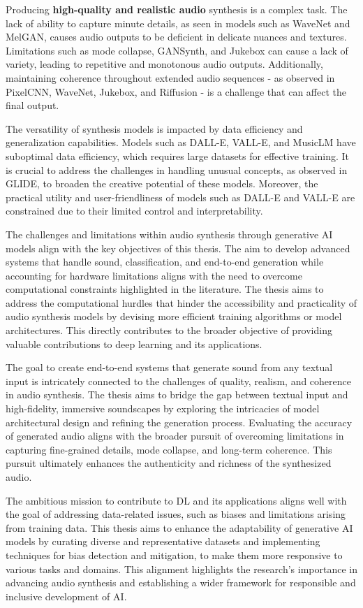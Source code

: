 Producing \textbf{high-quality and realistic audio} synthesis is a complex task. The lack of ability to capture minute details, as seen in models such as WaveNet and MelGAN, causes audio outputs to be deficient in delicate nuances and textures. Limitations such as mode collapse, GANSynth, and Jukebox can cause a lack of variety, leading to repetitive and monotonous audio outputs. Additionally, maintaining coherence throughout extended audio sequences - as observed in PixelCNN, WaveNet, Jukebox, and Riffusion - is a challenge that can affect the final output.

The versatility of synthesis models is impacted by data efficiency and generalization capabilities. Models such as DALL-E, VALL-E, and MusicLM have suboptimal data efficiency, which requires large datasets for effective training. It is crucial to address the challenges in handling unusual concepts, as observed in \ac{GLIDE}, to broaden the creative potential of these models. Moreover, the practical utility and user-friendliness of models such as DALL-E and VALL-E are constrained due to their limited control and interpretability.

The challenges and limitations within audio synthesis through generative AI models align with the key objectives of this thesis. The aim to develop advanced systems that handle sound, classification, and end-to-end generation while accounting for hardware limitations aligns with the need to overcome computational constraints highlighted in the literature. The thesis aims to address the computational hurdles that hinder the accessibility and practicality of audio synthesis models by devising more efficient training algorithms or model architectures. This directly contributes to the broader objective of providing valuable contributions to deep learning and its applications.

The goal to create end-to-end systems that generate sound from any textual input is intricately connected to the challenges of quality, realism, and coherence in audio synthesis. The thesis aims to bridge the gap between textual input and high-fidelity, immersive soundscapes by exploring the intricacies of model architectural design and refining the generation process. Evaluating the accuracy of generated audio aligns with the broader pursuit of overcoming limitations in capturing fine-grained details, mode collapse, and long-term coherence. This pursuit ultimately enhances the authenticity and richness of the synthesized audio.

The ambitious mission to contribute to \ac{DL} and its applications aligns well with the goal of addressing data-related issues, such as biases and limitations arising from training data. This thesis aims to enhance the adaptability of generative \ac{AI} models by curating diverse and representative datasets and implementing techniques for bias detection and mitigation, to make them more responsive to various tasks and domains. This alignment highlights the research's importance in advancing audio synthesis and establishing a wider framework for responsible and inclusive development of \ac{AI}.

